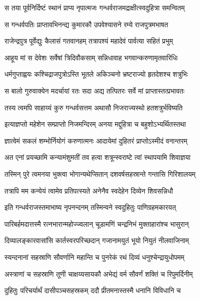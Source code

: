 \begin{center}
\twolineshloka
{स तया पूर्वनिर्दिष्टं स्थानं प्राप्य नृपात्मजः}
{गन्धर्वराजमद्राक्षीत्स्वदुहित्रा समन्वितम्} %

\twolineshloka
{स गन्धर्वपतिः प्राप्तावभिनन्द्य कुमारकौ}
{उपवेश्यासने रम्ये राजपुत्रमभाषत} %

\twolineshloka
{राजेन्द्रपुत्र पूर्वेद्युः कैलासं गतवानहम्}
{तत्रापश्यं महादेवं पार्वत्या सहितं प्रभुम्} %

\twolineshloka
{आहूय मां स देवेशः सर्वेषां त्रिदिवौकसाम्}
{सन्निधावाह भगवान्करुणामृतवारिधिः} %

\twolineshloka
{धर्मगुप्ताह्वयः कश्चिद्राजपुत्रोऽस्ति भूतले}
{अकिञ्चनो भ्रष्टराज्यो हृतदेशश्च शत्रुभिः} %

\twolineshloka
{स बालो गुरुवाक्येन मदर्चायां रतः सदा}
{अद्य तत्पितरः सर्वे मां प्राप्तास्तत्प्रभावतः} %

\twolineshloka
{तस्य त्वमपि साहाय्यं कुरु गन्धर्वसत्तम}
{अथासौ निजराज्यस्थो हतशत्रुर्भविष्यति} %

\twolineshloka
{इत्याज्ञप्तो महेशेन सम्प्राप्तो निजमन्दिरम्}
{अनया मद्दुहित्रा च बहुशोऽभ्यर्थितस्तथा} %

\twolineshloka
{ज्ञात्वेमं सकलं शम्भोर्नियोगं करुणात्मनः}
{आदायेमां दुहितरं प्राप्तोऽस्मीदं वनान्तरम्} %

\twolineshloka
{अत एनां प्रयच्छामि कन्यामंशुमतीं तव}
{हत्वा शत्रून्स्वराष्टे त्वां स्थापयामि शिवाज्ञया} %

\twolineshloka
{तस्मिन् पुरे त्वमनया भुक्त्वा भोगान्यथेप्सितान्}
{दशवर्षसहस्रान्ते गन्तासि गिरिशालयम्} %

\twolineshloka
{तत्रापि मम कन्येयं त्वामेव प्रतिपत्स्यते}
{अनेनैव स्वदेहेन दिव्येन शिवसन्निधौ} %

\twolineshloka
{इति गन्धर्वराजस्तमाभाष्य नृपनन्दनम्}
{तस्मिन्वने स्वदुहितुः पाणिग्रहमकारयत्} %

\twolineshloka
{पारिबर्हमदात्तस्मै रत्नभारान्महोज्ज्वलान्}
{चूडामणिं चन्द्रनिभं मुक्ताहारांश्च भासुरान्} %

\twolineshloka
{दिव्यालङ्कारवासांसि कार्तस्वरपरिच्छदान्}
{गजानामयुतं भूयो नियुतं नीलवाजिनाम्} %

\twolineshloka
{स्यन्दनानां सहस्राणि सौवर्णानि महान्ति च}
{पुनरेकं रथं दिव्यं धनुश्चेन्द्रायुधोपमम्} %

\twolineshloka
{अस्त्राणां च सहस्राणि तूणी चाक्षय्यसायकौ}
{अभेद्यं वर्म सौवर्णं शक्तिं च रिपुमर्दिनीम्} %

\twolineshloka
{दुहितुः परिचर्यार्थं दासीपञ्चसहस्रकम्}
{ददौ प्रीतमनास्तस्मै धनानि विविधानि च} %


\end{center}
